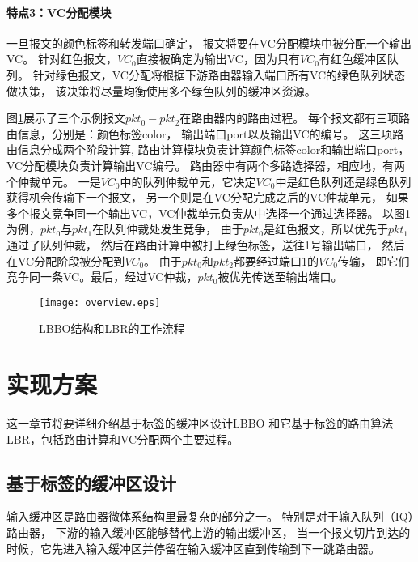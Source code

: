 \paragraph{特点3：VC分配模块}
一旦报文的颜色标签和转发端口确定，
报文将要在VC分配模块中被分配一个输出VC。
针对红色报文，$VC_0$直接被确定为输出VC，因为只有$VC_0$有红色缓冲区队列。
针对绿色报文，VC分配将根据下游路由器输入端口所有VC的绿色队列状态做决策，
该决策将尽量均衡使用多个绿色队列的缓冲区资源。

图\ref{fig:overview}展示了三个示例报文$pkt_0-pkt_2$在路由器内的路由过程。
每个报文都有三项路由信息，分别是：颜色标签color，
输出端口port以及输出VC的编号。
这三项路由信息分成两个阶段计算,
路由计算模块负责计算颜色标签color和输出端口port，
VC分配模块负责计算输出VC编号。
路由器中有两个多路选择器，相应地，有两个仲裁单元。
一是$VC_0$中的队列仲裁单元，它决定$VC_0$中是红色队列还是绿色队列获得机会传输下一个报文，
另一个则是在VC分配完成之后的VC仲裁单元，
如果多个报文竞争同一个输出VC，VC仲裁单元负责从中选择一个通过选择器。
以图\ref{fig:overview}为例，$pkt_0$与$pkt_1$在队列仲裁处发生竞争，
由于$pkt_0$是红色报文，所以优先于$pkt_1$通过了队列仲裁，
然后在路由计算中被打上绿色标签，送往1号输出端口，
然后在VC分配阶段被分配到$VC_0$。
由于$pkt_0$和$pkt_2$都要经过端口1的$VC_0$传输，
即它们竞争同一条VC。最后，经过VC仲裁，$pkt_0$被优先传送至输出端口。

\begin{figure}[t]
  \centering
  \texttt{[image: overview.eps]}
  \caption{LBBO结构和LBR的工作流程}
  \label{fig:overview}
\end{figure}

\section{实现方案}

这一章节将要详细介绍基于标签的缓冲区设计LBBO
和它基于标签的路由算法LBR，包括路由计算和VC分配两个主要过程。

\subsection{基于标签的缓冲区设计}

输入缓冲区是路由器微体系结构里最复杂的部分之一。
特别是对于输入队列（IQ）路由器，
下游的输入缓冲区能够替代上游的输出缓冲区，
当一个报文切片到达的时候，它先进入输入缓冲区并停留在输入缓冲区直到传输到下一跳路由器。

